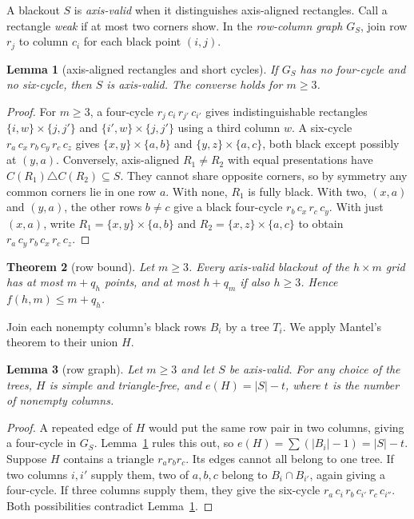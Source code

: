 \documentclass[12pt]{article}
\theoremstyle{plain}
\newtheorem{theorem}{Theorem}
\newtheorem{lemma}[theorem]{Lemma}
\theoremstyle{definition}
\theoremstyle{remark}
\begin{document}
A blackout $S$ is \emph{axis-valid} when it distinguishes axis-aligned
rectangles. Call a rectangle \emph{weak} if at most two corners show.
In the \emph{row-column graph} $G_S$, join row $r_j$ to column $c_i$
for each black point $(i,j)$.

\begin{lemma}[axis-aligned rectangles and short cycles]\label{lem:girth}
If $G_S$ has no four-cycle and no six-cycle, then $S$ is axis-valid. The converse holds for $m\ge3$.
\end{lemma}

\begin{proof}
For $m\ge3$, a four-cycle $r_j\,c_i\,r_{j'}\,c_{i'}$ gives
indistinguishable rectangles $\{i,w\}\times\{j,j'\}$ and
$\{i',w\}\times\{j,j'\}$ using a third column $w$.
A six-cycle $r_a\,c_x\,r_b\,c_y\,r_c\,c_z$ gives
$\{x,y\}\times\{a,b\}$ and $\{y,z\}\times\{a,c\}$, both black
except possibly at $(y,a)$.
Conversely, axis-aligned $R_1\ne R_2$ with equal presentations have
$C(R_1)\triangle C(R_2)\subseteq S$. They cannot share opposite corners,
so by symmetry any common corners lie in one row $a$.
With none, $R_1$ is fully black. With two, $(x,a)$ and $(y,a)$,
the other rows $b\ne c$ give a black four-cycle $r_b\,c_x\,r_c\,c_y$.
With just $(x,a)$, write $R_1=\{x,y\}\times\{a,b\}$ and
$R_2=\{x,z\}\times\{a,c\}$ to obtain
$r_a\,c_y\,r_b\,c_x\,r_c\,c_z$.
\end{proof}

\begin{theorem}[row bound]\label{thm:rowbound}
Let $m\ge3$. Every axis-valid blackout of the $h\times m$ grid has at most $m+q_h$ points, and at most $h+q_m$ if also $h\ge3$. Hence $f(h,m)\le m+q_h$.
\end{theorem}

Join each nonempty column's black rows $B_i$ by a tree $T_i$.
We apply Mantel's theorem to their union $H$.

\begin{lemma}[row graph]\label{lem:H}
Let $m\ge3$ and let $S$ be axis-valid. For any choice of the trees, $H$ is simple and triangle-free, and $e(H)=|S|-t$, where $t$ is the number of nonempty columns.
\end{lemma}

\begin{proof}
A repeated edge of $H$ would put the same row pair in two columns,
giving a four-cycle in $G_S$. Lemma~\ref{lem:girth} rules this out, so
$e(H)=\sum(|B_i|-1)=|S|-t$.
Suppose $H$ contains a triangle $r_ar_br_c$. Its edges cannot all
belong to one tree. If two columns $i,i'$ supply them, two of $a,b,c$
belong to $B_i\cap B_{i'}$, again giving a four-cycle. If three columns
supply them, they give the six-cycle
$r_a\,c_i\,r_b\,c_{i'}\,r_c\,c_{i''}$. Both possibilities contradict
Lemma~\ref{lem:girth}.
\end{proof}
\end{document}
